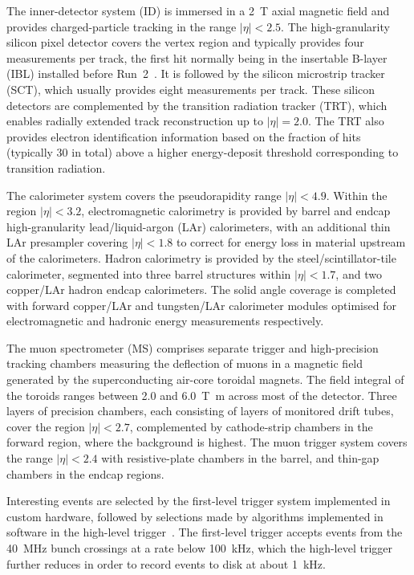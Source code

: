 The inner-detector system (ID) is immersed in a \qty{2}{\tesla} axial magnetic field 
and provides charged-particle tracking in the range \(|\eta| < 2.5\).
The high-granularity silicon pixel detector covers the vertex region and typically provides four measurements per track, 
the first hit normally being in the insertable B-layer (IBL) installed before Run~2~\cite{ATLAS-TDR-19,PIX-2018-001}.
It is followed by the silicon microstrip tracker (SCT), which usually provides eight measurements per track.
These silicon detectors are complemented by the transition radiation tracker (TRT),
which enables radially extended track reconstruction up to \(|\eta| = 2.0\). 
The TRT also provides electron identification information 
based on the fraction of hits (typically 30 in total) above a higher energy-deposit threshold corresponding to transition radiation.

The calorimeter system covers the pseudorapidity range \(|\eta| < 4.9\).
Within the region \(|\eta|< 3.2\), electromagnetic calorimetry is provided by barrel and 
endcap high-granularity lead/liquid-argon (LAr) calorimeters,
with an additional thin LAr presampler covering \(|\eta| < 1.8\)
to correct for energy loss in material upstream of the calorimeters.
Hadron calorimetry is provided by the steel/scintillator-tile calorimeter,
segmented into three barrel structures within \(|\eta| < 1.7\), and two copper/LAr hadron endcap calorimeters.
The solid angle coverage is completed with forward copper/LAr and tungsten/LAr calorimeter modules
optimised for electromagnetic and hadronic energy measurements respectively.

The muon spectrometer (MS) comprises separate trigger and
high-precision tracking chambers measuring the deflection of muons in a magnetic field generated by the superconducting air-core toroidal magnets.
The field integral of the toroids ranges between \num{2.0} and \qty{6.0}{\tesla\metre}
across most of the detector. 
Three layers of precision chambers, each consisting of layers of monitored drift tubes, cover the region \(|\eta| < 2.7\),
complemented by cathode-strip chambers in the forward region, where the background is highest.
The muon trigger system covers the range \(|\eta| < 2.4\) with resistive-plate chambers in the barrel, and thin-gap chambers in the endcap regions.

Interesting events are selected by the first-level trigger system implemented in custom hardware,
followed by selections made by algorithms implemented in software in the high-level trigger~\cite{TRIG-2016-01}. 
The first-level trigger accepts events from the \qty{40}{\MHz} bunch crossings at a rate below \qty{100}{\kHz},
which the high-level trigger further reduces in order to record events to disk at about \qty{1}{\kHz}.


